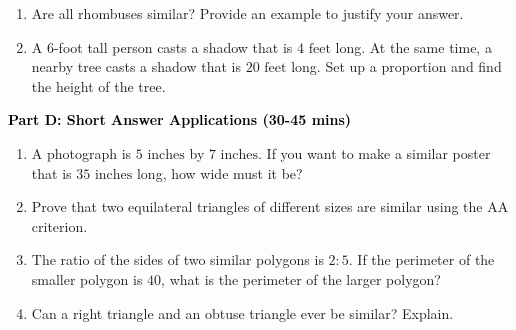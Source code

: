 \documentclass[12pt, letterpaper, fleqn]{article}
\begin{document}
\begin{enumerate}[itemsep=4.2cm, leftmargin=0.6cm, resume]
\item Are all rhombuses similar? Provide an example to justify your answer.
\item A 6-foot tall person casts a shadow that is $4\text{ feet}$ long. At the same time, a nearby tree casts a shadow that is $20\text{ feet}$ long. Set up a proportion and find the height of the tree.
\end{enumerate}

\newpage

\begin{tcolorbox}[colback=customteal!20]
\large\textcolor{black}{\textbf{Part D: Short Answer Applications (30-45 mins)}}
\end{tcolorbox}

\vspace{3mm}

\begin{enumerate}[itemsep=4.2cm, leftmargin=0.6cm, resume]
\item A photograph is $5\text{ inches}$ by $7\text{ inches}$. If you want to make a similar poster that is $35\text{ inches}$ long, how wide must it be?
\item Prove that two equilateral triangles of different sizes are similar using the AA criterion.
\item The ratio of the sides of two similar polygons is $2:5$. If the perimeter of the smaller polygon is $40$, what is the perimeter of the larger polygon?
\item Can a right triangle and an obtuse triangle ever be similar? Explain.
\end{enumerate}
\end{document}
